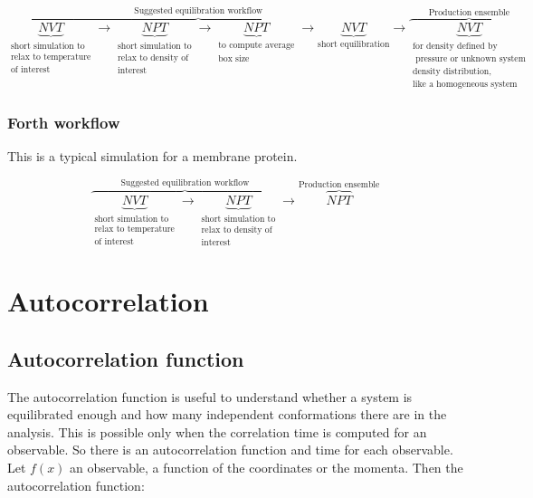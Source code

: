 		$$\overbrace{\underbrace{NVT}_{\substack{\text{short simulation to}\\\text{relax to temperature}\\\text{of interest}}}\rightarrow \underbrace{NPT}_{\substack{\text{short simulation to}\\\text{relax to density of}\\\text{interest}}}\rightarrow\underbrace{NPT}_{\substack{\text{to compute average}\\\text{box size}}}\rightarrow \underbrace{NVT}_{\text{short equilibration}}}^{\text{Suggested equilibration workflow}}\rightarrow\overbrace{\underbrace{NVT}_{\substack{\text{for density defined by}\\\text{ pressure or unknown system}\\\text{density distribution,}\\\text{like a homogeneous system}}}}^{\text{Production ensemble}}$$

		\subsubsection{Forth workflow}
		This is a typical simulation for a membrane protein.

		$$\overbrace{\underbrace{NVT}_{\substack{\text{short simulation to}\\\text{relax to temperature}\\\text{of interest}}}\rightarrow \underbrace{NPT}_{\substack{\text{short simulation to}\\\text{relax to density of}\\\text{interest}}}}^{\text{Suggested equilibration workflow}}\rightarrow	\overbrace{NPT}^{\text{Production ensemble}}$$

\section{Autocorrelation}

	\subsection{Autocorrelation function}
	The autocorrelation function is useful to understand whether a system is equilibrated enough and how many independent conformations there are in the analysis.
	This is possible only when the correlation time is computed for an observable.
	So there is an autocorrelation function and time for each observable.
	Let $f(x)$ an observable, a function of the coordinates or the momenta.
	Then the autocorrelation function:

